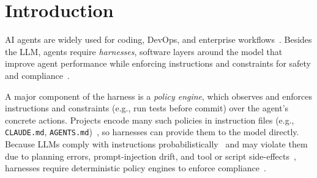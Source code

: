 \section{Introduction}

AI agents are widely used for coding, DevOps, and enterprise workflows~\cite{yang2024sweagent,wang2025openhands,debenedetti2024agentdojo,zhan2024injecagent,agentsight}.
Besides the LLM, agents require \emph{harnesses}, software layers around the model that improve agent performance while enforcing instructions and constraints for safety and compliance~\cite{fowler-harness}.


A major component of the harness is a \emph{policy engine}, which observes and enforces instructions and constraints (e.g., run tests before commit) over the agent's concrete actions.
Projects encode many such policies in instruction files (e.g., \texttt{CLAUDE.md}, \texttt{AGENTS.md})~\cite{chatlatanagulchai2025manifests,chatlatanagulchai2025agentreadmes,santos2025claudeconfig,lulla2026agentsmd}, so harnesses can provide them to the model directly.
Because LLMs comply with instructions probabilistically~\cite{liu2024lost,jiang2024followbench,qi2025agentif} and may violate them due to planning errors, prompt-injection drift, and tool or script side-effects~\cite{greshake2023indirectprompt,zhan2024injecagent}, harnesses require deterministic policy engines to enforce compliance~\cite{rebedea2023nemo,wang2025agentspec,debenedetti2025camel}.

